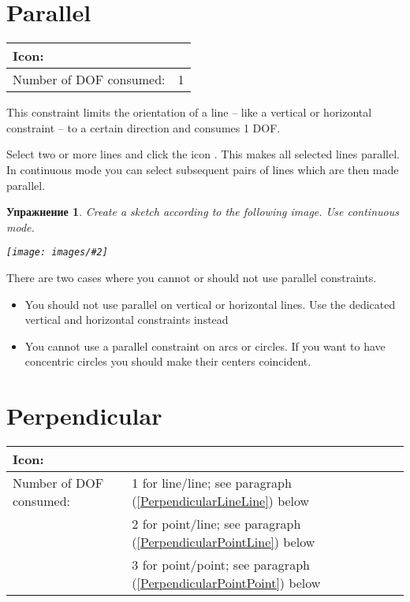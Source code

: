 \documentclass[12pt,titlepage]{article}
\newcommand{\icon}[1]{\raisebox{-1em}{\rule{0pt}{27pt}\texttt{[image: images/\#1]}}}
\newcommand{\img}[2]{\vspace{2ex}\noindent\texttt{[image: images/\#2]}}
\newcommand{\dofConsumed}{Number of DOF consumed:}
\newtheorem{Exercise}{Упражнение}
\begin{document}
\section{Parallel}
\begin{tabular}{|l|l|}
\hline
Icon: & \icon{Constraint_Parallel}\\
\hline
\dofConsumed & 1 \\
\hline
\end{tabular}

This constraint limits the orientation of a line -- like a vertical or horizontal constraint -- to
a certain direction and consumes 1 DOF.

Select two or more lines and click the icon \icon{Constraint_Parallel}. This makes
all selected lines parallel. In continuous mode you can select subsequent pairs of
lines which are then made parallel.

\begin{Exercise}
Create a sketch according to the following image. Use continuous mode.

\img{width=0.6\textwidth}{Parallelogramm}
\end{Exercise}

There are two cases where you cannot or should not use parallel constraints.
\begin{itemize}
\item You should not use parallel on vertical or horizontal lines. Use the dedicated
      vertical and horizontal constraints instead
\item You cannot use a parallel constraint on arcs or circles. If you want to have
      concentric circles you should make their centers coincident.
\end{itemize}

\section{Perpendicular}
\begin{tabular}{|l|l|}
\hline
Icon: & \icon{Constraint_Perpendicular}\\
\hline
\dofConsumed & 1 for line/line;
                            see paragraph (\ref{PerpendicularLineLine}) below \\
                        & 2 for point/line;
                            see paragraph (\ref{PerpendicularPointLine}) below \\
                        & 3 for point/point;
                            see paragraph (\ref{PerpendicularPointPoint}) below \\
\hline
\end{tabular}
\end{document}
